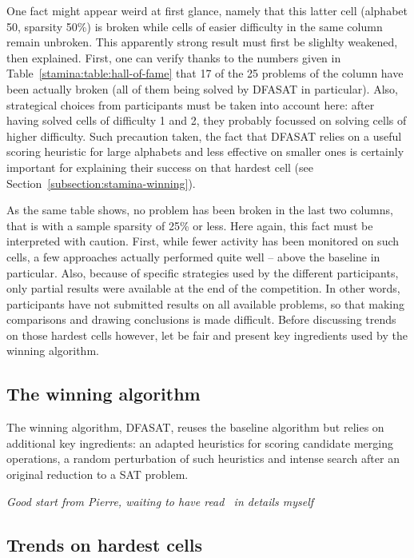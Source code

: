 One fact might appear weird at first glance, namely that this latter cell (alphabet 50, sparsity 50\%) is broken while cells of easier difficulty in the same column remain unbroken. This apparently strong result must first be slighlty weakened, then explained. First, one can verify thanks to the numbers given in Table~\ref{stamina:table:hall-of-fame} that 17 of the 25 problems of the column have been actually broken (all of them being solved by DFASAT in particular). Also, strategical choices from participants must be taken into account here: after having solved cells of difficulty 1 and 2, they probably focussed on solving cells of higher difficulty. Such precaution taken, the fact that DFASAT relies on a useful scoring heuristic for large alphabets and less effective on smaller ones is certainly important for explaining their success on that hardest cell (see Section~\ref{subsection:stamina-winning}).

As the same table shows, no problem has been broken in the last two columns, that is with a sample sparsity of 25\% or less. Here again, this fact must be interpreted with caution. First, while fewer activity has been monitored on such cells, a few approaches actually performed quite well -- above the baseline in particular. Also, because of specific strategies used by the different participants, only partial results were available at the end of the competition. In other words, participants have not submitted results on all available problems, so that making comparisons and drawing conclusions is made difficult. Before discussing trends on those hardest cells however, let be fair and present key ingredients used by the winning algorithm.

\subsection{The winning algorithm\label{subsection:stamina-winning}}

The winning algorithm, DFASAT, reuses the baseline algorithm but relies on additional key ingredients: an adapted heuristics for scoring candidate merging operations, a random perturbation of such heuristics and intense search after an original reduction to a SAT problem. 

\noindent \emph{Good start from Pierre, waiting to have read~\cite{Heule10} in details myself}

\subsection{Trends on hardest cells\label{subsection:stamina-trends-on-hardest-cells}}

